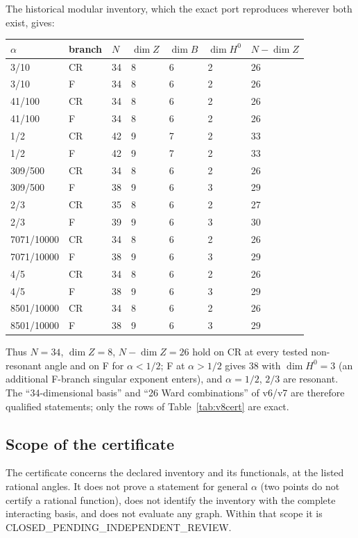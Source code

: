 \documentclass[11pt,a4paper]{article}
\newcommand{\CPIR}{\textsf{CLOSED\_PENDING\_}\allowbreak\textsf{INDEPENDENT\_REVIEW}}
\theoremstyle{plain}
\theoremstyle{definition}
\theoremstyle{remark}
\numberwithin{equation}{section}
\begin{document}
The historical modular inventory, which the exact port reproduces
wherever both exist, gives:
\begin{center}
\scriptsize
\begin{tabular}{@{}lllllll@{}}
\toprule
\(\alpha\) & branch & \(N\) & \(\dim Z\) & \(\dim B\) & \(\dim H^0\) & \(N-\dim Z\)\\
\midrule
3/10 & CR & 34 & 8 & 6 & 2 & 26\\
3/10 & F & 34 & 8 & 6 & 2 & 26\\
41/100 & CR & 34 & 8 & 6 & 2 & 26\\
41/100 & F & 34 & 8 & 6 & 2 & 26\\
1/2 & CR & 42 & 9 & 7 & 2 & 33\\
1/2 & F & 42 & 9 & 7 & 2 & 33\\
309/500 & CR & 34 & 8 & 6 & 2 & 26\\
309/500 & F & 38 & 9 & 6 & 3 & 29\\
2/3 & CR & 35 & 8 & 6 & 2 & 27\\
2/3 & F & 39 & 9 & 6 & 3 & 30\\
7071/10000 & CR & 34 & 8 & 6 & 2 & 26\\
7071/10000 & F & 38 & 9 & 6 & 3 & 29\\
4/5 & CR & 34 & 8 & 6 & 2 & 26\\
4/5 & F & 38 & 9 & 6 & 3 & 29\\
8501/10000 & CR & 34 & 8 & 6 & 2 & 26\\
8501/10000 & F & 38 & 9 & 6 & 3 & 29\\
\bottomrule
\end{tabular}
\end{center}
Thus \(N=34\), \(\dim Z=8\), \(N-\dim Z=26\) hold on CR at every
tested non-resonant angle and on F for \(\alpha<1/2\); F at
\(\alpha>1/2\) gives \(38\) with \(\dim H^0=3\) (an additional
F-branch singular exponent enters), and \(\alpha=1/2\), \(2/3\) are
resonant. The ``34-dimensional basis'' and ``26 Ward combinations''
of v6/v7 are therefore qualified statements; only the rows of
Table~\ref{tab:v8cert} are exact.

\subsection{Scope of the certificate}

The certificate concerns the declared inventory and its functionals,
at the listed rational angles. It does not prove a statement for
general \(\alpha\) (two points do not certify a rational function),
does not identify the inventory with the complete interacting basis,
and does not evaluate any graph. Within that scope it is
\CPIR.
\end{document}
